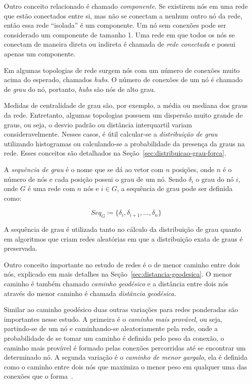 \documentclass[12pt,a4paper]{article}
\theoremstyle{hypo}
\newcommand{\defn}{\coloneqq} %
\begin{document}
Outro conceito relacionado é chamado \textit{componente}. Se existirem nós em uma rede que estão conectados entre si, mas não se conectam a nenhum outro nó da rede, então essa rede \enquote{isolada} é um componente. Um nó sem conexões pode ser considerado um componente de tamanho 1. Uma rede em que todos os nós se conectam de maneira direta ou indireta é chamada de \textit{rede conectada} e possui apenas um componente.

Em algumas topologias de rede surgem nós com um número de conexões muito acima do esperado, chamados \textit{hubs}. O número de conexões de um nó é chamado de \textit{grau} do nó, portanto, \textit{hubs} são nós de alto grau.

Medidas de centralidade de grau são, por exemplo, a média ou mediana dos graus da rede. Entretanto, algumas topologias possuem um dispersão muito grande de graus, ou seja, o desvio padrão ou distância interquartil variam consideravelmente. Nesses casos, é útil calcular-se a \textit{distribuição de grau} utilizando histogramas ou calculando-se a probabilidade da presença da graus na rede. Esses conceitos são detalhados na Seção~\ref{sec:distribuicao-grau-forca}.

A \textit{sequência de grau} é o nome que se dá ao vetor com $n$ posições, onde $n$ é o número de nós e cada posição possui o grau de um nó. Sendo $\delta_i$ o grau do nó $i$, onde $G$ é uma rede com $n$ nós e $i \in G$, a sequência de grau pode ser definida como:

\begin{equation} \label{eq:sequencia-grau}
\textit{Seq}_G \defn \{\delta_i, \delta_{i+1}, \ldots, \delta_n\}
\end{equation}

A sequência de grau é utilizada tanto no cálculo da distribuição de grau quanto em algoritmos que criam redes aleatórias em que a distribuição exata de graus é preservada.

Outro conceito importante no estudo de redes é o de menor caminho entre dois nós, explicado em mais detalhes na Seção~\ref{sec:distancia-geodesica}. O menor caminho é também chamado \textit{caminho geodésico} e a distância entre dois nós através do menor caminho é chamada \textit{distância geodésica}.

Similar ao caminho geodésico duas outras variações para redes ponderadas são importantes nesse estudo. A primeira é o \textit{caminho mais provável}, ou seja, partindo-se de um nó e caminhando-se aleatoriamente pela rede, onde a probabilidade de se tomar um caminho é definida pelo peso da conexão, o caminho mais provável é formado pelas conexões percorridas até se encontrar um determinado nó. A segunda variação é o \textit{caminho de menor gargalo}, ela é definida como o caminho entre dois nós que maximiza o menor peso em qualquer uma das conexões que o forma~\cite{Goldbarg2012-uc}.
\end{document}
